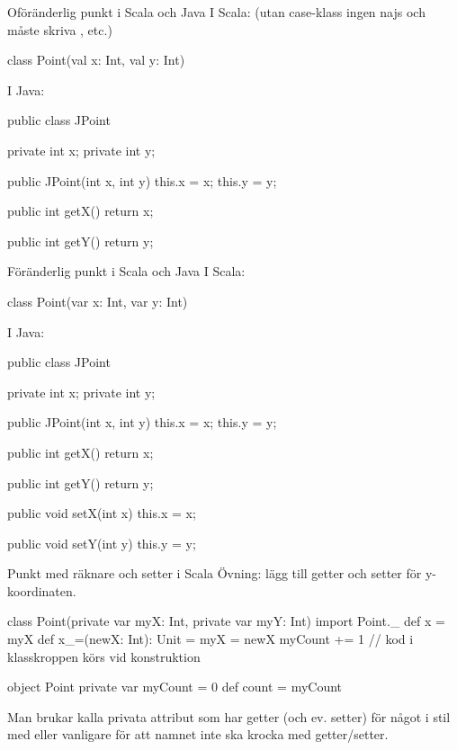 \begin{Slide}{Oföränderlig punkt  i Scala och Java}\SlideFontSmall
I Scala: (utan case-klass ingen najs  och måste skriva , etc.)
\begin{Code}
class Point(val x: Int, val y: Int)
\end{Code}

I Java:
\begin{Code}[language=Java,basicstyle=\ttfamily\SlideFontSize{5.8}{7}]
public class JPoint {
    private int x;
    private int y;

    public JPoint(int x, int y){
        this.x = x;
        this.y = y;
    }

    public int getX(){
        return x;
    }

    public int getY(){
        return y;
    }
}
\end{Code}
\end{Slide}

\begin{Slide}{Föränderlig punkt  i Scala och Java}\SlideFontSmall
I Scala:
\begin{Code}
class Point(var x: Int, var y: Int)
\end{Code}

I Java:
\begin{Code}[language=Java,basicstyle=\ttfamily\SlideFontSize{5.2}{6}]
public class JPoint {
    private int x;
    private int y;

    public JPoint(int x, int y){
        this.x = x;
        this.y = y;
    }

    public int getX(){
        return x;
    }

    public int getY(){
        return y;
    }

    public void setX(int x){
        this.x = x;
    }

    public void setY(int y){
        this.y = y;
    }
}
\end{Code}
\end{Slide}

\begin{Slide}{Punkt med räknare och setter i Scala}
Övning: lägg till getter och setter för y-koordinaten.
\begin{Code}
class Point(private var myX: Int, private var myY: Int){
  import Point._
  def x = myX
  def x_=(newX: Int): Unit = {
    myX = newX
  }
  myCount += 1   // kod i klasskroppen körs vid konstruktion
}

object Point {
  private var myCount = 0
  def count = myCount
}
\end{Code}
\SlideFontSmall
Man brukar kalla privata attribut som har getter (och ev. setter) för något i stil med  eller vanligare  för att namnet inte ska krocka med getter/setter.
\end{Slide}



